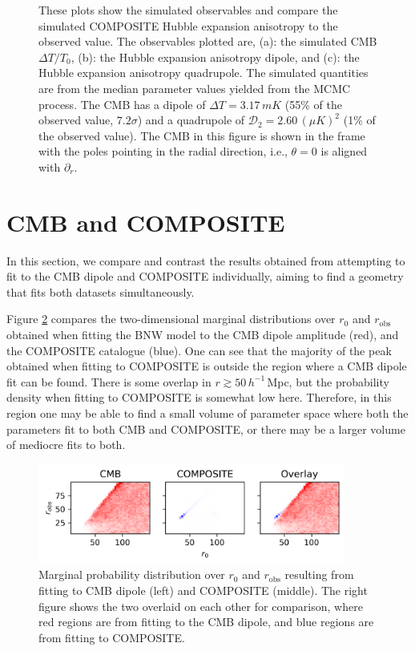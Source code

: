 \documentclass[a4paper,12pt]{report}
\begin{document}
\begin{figure}
\begin{subfigure}[b]{105mm}
        \caption{}
    \end{subfigure}
    \caption{These plots show the simulated observables and compare the simulated COMPOSITE Hubble expansion anisotropy to the observed value. The observables plotted are, (a): the simulated CMB $\Delta T / T_0$, (b): the Hubble expansion anisotropy dipole, and (c): the Hubble expansion anisotropy quadrupole. The simulated quantities are from the median parameter values yielded from the MCMC process. The CMB has a dipole of $\Delta T = 3.17\, \si{mK}$ (55\% of the observed value, $7.2\sigma$) and a quadrupole of $\mathcal{D}_2 = 2.60\, (\mu \si{K})^2$ (1\% of the observed value). The CMB in this figure is shown in the frame with the poles pointing in the radial direction, i.e., $\theta=0$ is aligned with $\partial_r$.}
    \label{fig: BNW COMP MCMC 0.5 quantile observables}
\end{figure}

\section{CMB and COMPOSITE}\label{section: BNW model fitting CMB and COMPOSITE}
In this section, we compare and contrast the results obtained from attempting to fit to the CMB dipole and COMPOSITE individually, aiming to find a geometry that fits both datasets simultaneously.

Figure \ref{fig: marginal r_0 and r_obs comparison} compares the two-dimensional marginal distributions over $r_0$ and $r_\text{obs}$ obtained when fitting the BNW model to the CMB dipole amplitude (red), and the COMPOSITE catalogue (blue). One can see that the majority of the peak obtained when fitting to COMPOSITE is outside the region where a CMB dipole fit can be found. There is some overlap in $r \gtrsim 50\, h^{-1}\,$Mpc, but the probability density when fitting to COMPOSITE is somewhat low here. Therefore, in this region one may be able to find a small volume of parameter space where both the parameters fit to both CMB and COMPOSITE, or there may be a larger volume of mediocre fits to both.

\begin{figure}[h]
    \centering
    \includegraphics[width=0.9\textwidth]{BNW Model MCMC/Comparisons/CMB vs COMPOSITE r0 vs robs.png}
    \caption{Marginal probability distribution over $r_0$ and $r_\text{obs}$ resulting from fitting to CMB dipole (left) and COMPOSITE (middle). The right figure shows the two overlaid on each other for comparison, where red regions are from fitting to the CMB dipole, and blue regions are from fitting to COMPOSITE.}
    \label{fig: marginal r_0 and r_obs comparison}
\end{figure}
\end{document}
